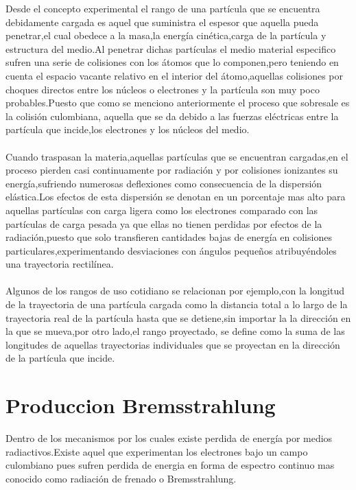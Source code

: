 \documentclass[12pt,fleqn]{book} %
\numberwithin{equation}{section} %
\numberwithin{figure}{section} %
\numberwithin{table}{section} %
\begin{document}
 Desde el concepto experimental el rango de una partícula que se encuentra debidamente cargada es aquel que suministra el espesor que aquella pueda penetrar,el cual obedece a la masa,la energía cinética,carga de la partícula y estructura del medio.Al penetrar dichas partículas el medio material especifico sufren una serie de colisiones con los átomos que lo componen,pero teniendo en cuenta el espacio vacante relativo en el interior del átomo,aquellas colisiones por choques directos entre los núcleos o electrones y la partícula son muy poco probables.Puesto que como se menciono anteriormente el proceso que sobresale es la colisión culombiana, aquella que se da debido a las fuerzas eléctricas entre la partícula que incide,los electrones y los núcleos del medio. 
 \\\\ 
 Cuando traspasan la materia,aquellas partículas que se encuentran cargadas,en el proceso pierden casi continuamente por radiación y por colisiones ionizantes su energía,sufriendo numerosas deflexiones como consecuencia de la dispersión elástica.Los efectos de esta dispersión se denotan en un porcentaje mas alto para aquellas partículas con carga ligera como los electrones comparado con las partículas de carga pesada ya que ellas no tienen perdidas por efectos de la radiación,puesto que solo transfieren cantidades bajas de energía en colisiones particulares,experimentando desviaciones con ángulos pequeños atribuyéndoles una trayectoria rectilínea.
 \\\\
 Algunos de los rangos de uso cotidiano se relacionan por ejemplo,con la longitud de la trayectoria de una partícula cargada como la distancia total a lo largo de la trayectoria real de la partícula hasta que se detiene,sin importar la  la dirección en la que se mueva,por otro lado,el rango proyectado, se define como la suma de las longitudes de aquellas trayectorias individuales que se proyectan en la dirección de la partícula que incide. 
 
 \section{Produccion Bremsstrahlung}
 
 Dentro de los mecanismos por los cuales existe perdida de energía por medios radiactivos.Existe aquel que experimentan los electrones bajo un campo culombiano pues sufren perdida de energia en forma de espectro continuo mas conocido como radiación de frenado o  Bremsstrahlung.
 
\end{document}

